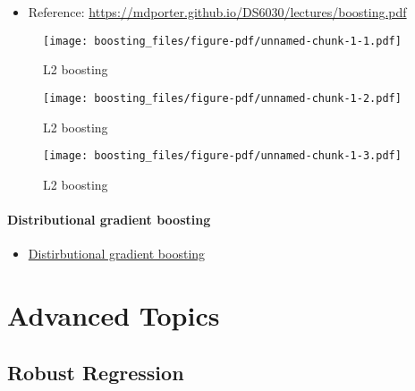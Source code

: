 \documentclass[
  letterpaper,
  DIV=11,
  numbers=noendperiod]{scrreprt}
\providecommand{\tightlist}{%
  \setlength{\itemsep}{0pt}\setlength{\parskip}{0pt}}\usepackage{longtable,booktabs,array}
\theoremstyle{definition}
\theoremstyle{plain}
\theoremstyle{remark}
\begin{document}
\begin{itemize}
\tightlist
\item
  Reference:
  \url{https://mdporter.github.io/DS6030/lectures/boosting.pdf}
\end{itemize}

\begin{figure}[H]

{\centering \texttt{[image: boosting\_files/figure-pdf/unnamed-chunk-1-1.pdf]}

}

\caption{L2 boosting}

\end{figure}%

\begin{figure}[H]

{\centering \texttt{[image: boosting\_files/figure-pdf/unnamed-chunk-1-2.pdf]}

}

\caption{L2 boosting}

\end{figure}%

\begin{figure}[H]

{\centering \texttt{[image: boosting\_files/figure-pdf/unnamed-chunk-1-3.pdf]}

}

\caption{L2 boosting}

\end{figure}%

\subsection{Distributional gradient
boosting}\label{distributional-gradient-boosting}

\begin{itemize}
\tightlist
\item
  \href{https://ar5iv.labs.arxiv.org/html/2204.00778}{Distirbutional
  gradient boosting}
\end{itemize}

\part{Advanced Topics}

\chapter{Robust Regression}\label{robust-regression}
\end{document}
